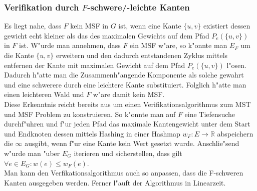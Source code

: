 \subsubsection{Verifikation durch $F$-schwere/-leichte Kanten}
\label{sec:verification}
Es liegt nahe, dass $F$ kein MSF in $G$ ist, wenn eine Kante $\{u,v\}$ 
    existiert dessen gewicht echt kleiner als das des maximalen Gewichts auf dem
    Pfad $P_e(\{u,v\})$ in $F$ ist. W"urde man annehmen, dass $F$ ein MSF w"are, 
    so k"onnte man $E_F$ um die Kante $\{u,v\}$ erweitern und den dadurch 
    entstandenen Zyklus mittels entfernen der Kante mit maximalen Gewicht auf dem
    Pfad $P_e(\{u,v\})$ l"osen. Dadurch h"atte man die Zusammenh"angende 
    Komponente als solche gewahrt und eine schwerere durch eine leichtere Kante
    substituiert. Folglich h"atte man einen leichteren Wald und $F$ w"are damit
    kein MSF.\\
Diese Erkenntnis reicht bereits aus um einen Verifikationsalgorithmus zum 
    MST und MSF Problem zu konstruieren.
    So k"onnte man auf $F$ eine Tiefensuche durchf"uhren und f"ur jeden Pfad 
    das maximale Kantengewicht unter dem Start und Endknoten dessen mittels
    Hashing in einer Hashmap $w_F : E \rightarrow \mathbb{R}$ abspeichern die 
    $\infty$ ausgibt, wenn f"ur eine Kante kein Wert gesetzt wurde.
    Anschlie"send w"urde man "uber $E_G$ iterieren und sicherstellen, dass gilt
    $\forall e \in E_G: w(e) \leq w_F(e)$.\\
Man kann den Verfikationsalgorithmus auch so anpassen, dass die F-schweren Kanten
    ausgegeben werden.
    Ferner l"auft der Algorithmus in Linearzeit.\\
